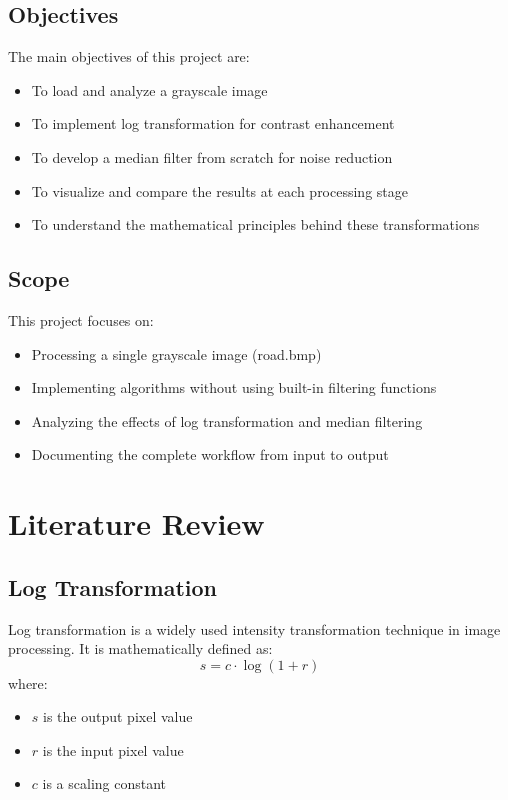 \documentclass[12pt,a4paper]{article}
\begin{document}
\subsection{Objectives}
The main objectives of this project are:
\begin{itemize}
    \item To load and analyze a grayscale image
    \item To implement log transformation for contrast enhancement
    \item To develop a median filter from scratch for noise reduction
    \item To visualize and compare the results at each processing stage
    \item To understand the mathematical principles behind these transformations
\end{itemize}

\subsection{Scope}
This project focuses on:
\begin{itemize}
    \item Processing a single grayscale image (road.bmp)
    \item Implementing algorithms without using built-in filtering functions
    \item Analyzing the effects of log transformation and median filtering
    \item Documenting the complete workflow from input to output
\end{itemize}

\section{Literature Review}

\subsection{Log Transformation}
Log transformation is a widely used intensity transformation technique in image processing. It is mathematically defined as:
\begin{equation}
    s = c \cdot \log(1 + r)
\end{equation}
where:
\begin{itemize}
    \item $s$ is the output pixel value
    \item $r$ is the input pixel value
    \item $c$ is a scaling constant
\end{itemize}
\end{document}
